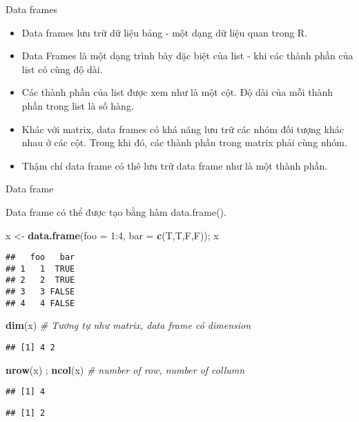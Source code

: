 \documentclass[
  ignorenonframetext,
]{beamer}
\newenvironment{Shaded}{}{}
\newcommand{\CommentTok}[1]{\textcolor[rgb]{0.38,0.63,0.69}{\textit{#1}}}
\newcommand{\DataTypeTok}[1]{\textcolor[rgb]{0.56,0.13,0.00}{#1}}
\newcommand{\DecValTok}[1]{\textcolor[rgb]{0.25,0.63,0.44}{#1}}
\newcommand{\KeywordTok}[1]{\textcolor[rgb]{0.00,0.44,0.13}{\textbf{#1}}}
\newcommand{\NormalTok}[1]{#1}
\newcommand{\OperatorTok}[1]{\textcolor[rgb]{0.40,0.40,0.40}{#1}}
\newcommand{\StringTok}[1]{\textcolor[rgb]{0.25,0.44,0.63}{#1}}
\begin{document}
\begin{frame}{Data frames}
\protect\hypertarget{data-frames}{}

\begin{itemize}[<+->]
\item
  Data frames lưu trữ dữ liệu bảng - một dạng dữ liệu quan trong R.
\item
  Data Frames là một dạng trình bày đặc biệt của list - khi các thành
  phần của list có cùng độ dài.
\item
  Các thành phần của list được xem như là một cột. Độ dài của mỗi thành
  phần trong list là số hàng.
\item
  Khác với matrix, data frames có khá năng lưu trữ các nhóm đối tượng
  khác nhau ở các cột. Trong khi đó, các thành phần trong matrix phải
  cùng nhóm.
\item
  Thậm chí data frame có thê lưu trữ data frame như là một thành phần.
\end{itemize}

\end{frame}

\begin{frame}[fragile]{Data frame}
\protect\hypertarget{data-frame}{}

Data frame có thể được tạo bằng hàm data.frame().

\begin{Shaded}
\begin{Highlighting}[]
\NormalTok{x <-}\StringTok{ }\KeywordTok{data.frame}\NormalTok{(}\DataTypeTok{foo =} \DecValTok{1}\OperatorTok{:}\DecValTok{4}\NormalTok{, }\DataTypeTok{bar =} \KeywordTok{c}\NormalTok{(T,T,F,F)); x}
\end{Highlighting}
\end{Shaded}

\begin{verbatim}
##   foo   bar
## 1   1  TRUE
## 2   2  TRUE
## 3   3 FALSE
## 4   4 FALSE
\end{verbatim}

\begin{Shaded}
\begin{Highlighting}[]
\KeywordTok{dim}\NormalTok{(x) }\CommentTok{# Tương tự như matrix, data frame có dimension}
\end{Highlighting}
\end{Shaded}

\begin{verbatim}
## [1] 4 2
\end{verbatim}

\begin{Shaded}
\begin{Highlighting}[]
\KeywordTok{nrow}\NormalTok{(x) ; }\KeywordTok{ncol}\NormalTok{(x)  }\CommentTok{# number of row, number of collumn}
\end{Highlighting}
\end{Shaded}

\begin{verbatim}
## [1] 4
\end{verbatim}

\begin{verbatim}
## [1] 2
\end{verbatim}

\end{frame}
\end{document}
